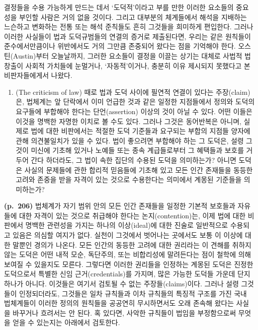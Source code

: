 결정들을 수용 가능하게 만드는 데서 ‘도덕적’이라고 부를 만한 이러한
요소들의 중요성을 부인할 사람은 거의 없을 것이다. 그리고 대부분의
체계들에서 해석을 지배하는 느슨하고 변화하는 전통 또는 해석 준칙들도
흔히 그것들을 희미하게 편입한다. 그러나 이러한 사실들이 법과
도덕규범들의  연결의 증거로 제출된다면, 우리는 같은
원칙들이 준수에서만큼이나 위반에서도 거의 그만큼 존중되어 왔다는 점을
기억해야 한다. 오스틴(Austin)부터 오늘날까지, 그러한 요소들이 결정을
이끌는 상기는 대체로 사법적 법창출이 사회적 가치들에
눈멀거나, ‘자동적’이거나, 충분히 이유 제시되지 못했다고 본
비판자들에게서 나왔다.

\begin{enumerate}
\def\labelenumi{(\roman{enumi})}
\setcounter{enumi}{3}
\tightlist
\item
   (The criticism of law) 때로 법과 도덕 사이에
  필연적 연결이 있다는 주장(claim)은,  법체계는 앞 단락에서
  이미 언급한 것과 같은 일정한 지점들에서 정의와 도덕의 요구들에
  부합해야 한다는 단언(assertion) 이상의 것이 아닐 수 있다. 어떤 이들은
  이것을 명백한 자명한 이치로 볼 수도 있다. 그러나 그것은 동어반복은
  아니며, 실제로 법에 대한 비판에서는 적절한 도덕 기준들과 요구되는
  부합의 지점들 양자에 관해 의견불일치가 있을 수 있다. 법이 좋으려면
  부합해야 하는 그 도덕은, 설령 그것이 미신에 기초해 있거나 노예들 또는
  종속 계급들로부터 그 혜택들과 보호를 거두어 간다 하더라도, 그 법이
  속한 집단의 수용된 도덕을 의미하는가? 아니면 도덕은 사실의 문제들에
  관한 합리적 믿음들에 기초해 있고 모든 인간 존재들을 동등한 고려와
  존중을 받을 자격이 있는 것으로 수용한다는 의미에서 계몽된 기준들을
  의미하는가?
\end{enumerate}

\textbf{(p.~206)} 법체계가 자기 범위 안의 모든 인간 존재들을 일정한
기본적 보호들과 자유들에 대한 자격이 있는 것으로 취급해야 한다는
논지(contention)는, 이제 법에 대한 비판에서 명백한 관련성을 가지는
하나의 이상(ideal)에 대한 진술로 일반적으로 수용되고 있음은 의심할
여지가 없다. 실천이 그것에서 벗어나는 곳에서도 보통 이 이상에 대한
말뿐인 경의가 나온다. 모든 인간의 동등한 고려에 대한 권리라는 이 견해를
취하지 않는 도덕은 어떤 내적 모순, 독단주의, 또는 비합리성에 말려든다는
점이 철학에 의해 보여질 수 있을지도 모른다. 그렇다면 이러한 권리들을
인정하는 계몽된 도덕은 진정한 도덕으로서 특별한 신임 근거(credentials)를
가지며, 많은 가능한 도덕들 가운데 단지 하나가 아니다. 이것들은 여기서
검토될 수 없는 주장들(claims)이다. 그러나 설령 그것들이 인정되더라도,
그것들은 일차 규칙들과 이차 규칙들의 특징적 구조를 가진 국내 법체계들이
이러한 정의의 원칙들을 공공연히 무시하면서도 오래 존속해 왔다는 사실을
바꾸거나 흐려서는 안 된다. 혹 있다면, 사악한 규칙들이 법임을
부정함으로써 무엇을 얻을 수 있는지는 아래에서 검토한다.

